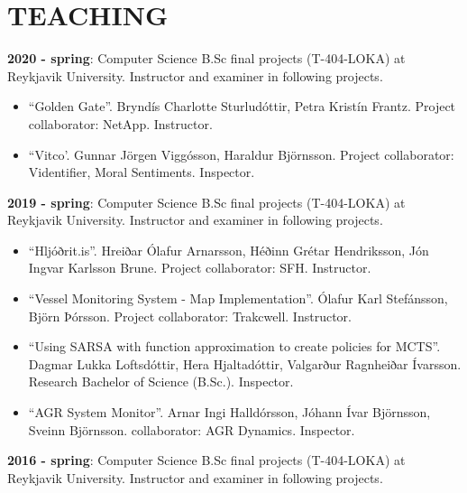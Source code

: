 \section{TEACHING}
\textbf{2020 - spring}:
Computer Science B.Sc final projects (T-404-LOKA) at Reykjavik University. Instructor and examiner in following projects.

\begin{itemize}
\item ``Golden Gate''. Bryndís Charlotte Sturludóttir, Petra Kristín Frantz. Project collaborator: NetApp. Instructor.

\item ``Vitco'. Gunnar Jörgen Viggósson, Haraldur Björnsson. Project collaborator: Videntifier, Moral Sentiments. Inspector.
\end{itemize}

\textbf{2019 - spring}:
Computer Science B.Sc final projects (T-404-LOKA) at Reykjavik University. Instructor and examiner in following projects.

\begin{itemize}
\item ``Hljóðrit.is''. Hreiðar Ólafur Arnarsson, Héðinn Grétar Hendriksson, Jón
	Ingvar Karlsson Brune. Project collaborator: SFH. Instructor.

\item ``Vessel Monitoring System - Map Implementation''. Ólafur Karl Stefánsson,
	Björn Þórsson. Project collaborator: Trakcwell. Instructor.

\item ``Using SARSA with function approximation to create policies for MCTS''.
	Dagmar Lukka Loftsdóttir, Hera Hjaltadóttir, Valgarður Ragnheiðar Ívarsson.
		Research Bachelor of Science (B.Sc.). Inspector.

\item ``AGR System Monitor''. Arnar Ingi Halldórsson, Jóhann Ívar Björnsson,
	Sveinn Björnsson. collaborator: AGR Dynamics. Inspector.
\end{itemize}

\textbf{2016 - spring}:
Computer Science B.Sc final projects (T-404-LOKA) at Reykjavik University. Instructor and examiner in following projects.

